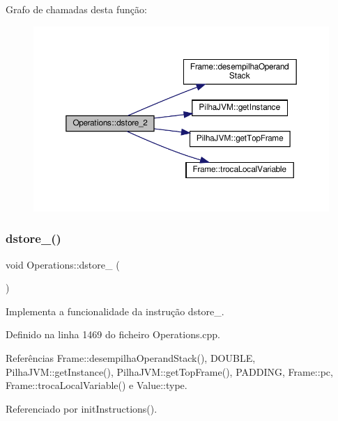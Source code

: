 Grafo de chamadas desta função\+:
\nopagebreak
\begin{figure}[H]
\begin{center}
\leavevmode
\includegraphics[width=350pt]{classOperations_ad0f97963e6eb2482f5032fdb3465ec94_cgraph}
\end{center}
\end{figure}
\mbox{\label{classOperations_a161cba32105238617b0cfd5c47afdfe4}} 
\subsubsection{\texorpdfstring{dstore\+\_()}{dstore\_3()}}
{\footnotesize\ttfamily void Operations\+::dstore\+\_ (\begin{DoxyParamCaption}{ }\end{DoxyParamCaption})\hspace{0.3cm}{\ttfamily [private]}}



Implementa a funcionalidade da instrução dstore\+\_. 



Definido na linha 1469 do ficheiro Operations.\+cpp.



Referências Frame\+::desempilha\+Operand\+Stack(), D\+O\+U\+B\+LE, Pilha\+J\+V\+M\+::get\+Instance(), Pilha\+J\+V\+M\+::get\+Top\+Frame(), P\+A\+D\+D\+I\+NG, Frame\+::pc, Frame\+::troca\+Local\+Variable() e Value\+::type.



Referenciado por init\+Instructions().


